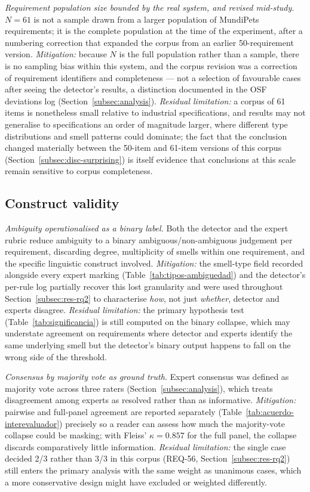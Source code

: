 \documentclass[pdflatex,sn-mathphys-num]{sn-jnl}
\theoremstyle{thmstyleone}%
\theoremstyle{thmstyletwo}%
\theoremstyle{thmstylethree}%
\begin{document}
	\emph{Requirement population size bounded by the real system, and revised
		mid-study.} $N=61$ is not a sample drawn from a larger population of MundiPets
	requirements; it is the complete population at the time of the experiment,
	after a numbering correction that expanded the corpus from an earlier
	50-requirement version. \emph{Mitigation:} because $N$ is the full population
	rather than a sample, there is no sampling bias within this system, and the
	corpus revision was a correction of requirement identifiers and completeness
	--- not a selection of favourable cases after seeing the detector's results, a
	distinction documented in the OSF deviations log
	(Section~\ref{subsec:analysis}). \emph{Residual limitation:} a corpus of 61
	items is nonetheless small relative to industrial specifications, and results
	may not generalise to specifications an order of magnitude larger, where
	different type distributions and smell patterns could dominate; the fact that
	the conclusion changed materially between the 50-item and 61-item versions of
	this corpus (Section~\ref{subsec:disc-surprising}) is itself evidence that
	conclusions at this scale remain sensitive to corpus completeness.
	
	\subsection{Construct validity}\label{subsec:threats-construct}
	
	\emph{Ambiguity operationalised as a binary label.} Both the detector and the
	expert rubric reduce ambiguity to a binary ambiguous/non-ambiguous judgement per
	requirement, discarding degree, multiplicity of smells within one requirement,
	and the specific linguistic construct involved. \emph{Mitigation:} the
	smell-type field recorded alongside every expert marking
	(Table~\ref{tab:tipos-ambiguedad}) and the detector's per-rule log partially
	recover this lost granularity and were used throughout
	Section~\ref{subsec:res-rq2} to characterise \emph{how}, not just \emph{whether},
	detector and experts disagree. \emph{Residual limitation:} the primary
	hypothesis test (Table~\ref{tab:significancia}) is still computed on the binary
	collapse, which may understate agreement on requirements where detector and
	experts identify the same underlying smell but the detector's binary output
	happens to fall on the wrong side of the threshold.
	
	\emph{Consensus by majority vote as ground truth.} Expert consensus was defined
	as majority vote across three raters (Section~\ref{subsec:analysis}), which
	treats disagreement among experts as resolved rather than as informative.
	\emph{Mitigation:} pairwise and full-panel agreement are reported separately
	(Table~\ref{tab:acuerdo-interevaluador}) precisely so a reader can assess how
	much the majority-vote collapse could be masking; with Fleiss' $\kappa=0.857$
	for the full panel, the collapse discards comparatively little information.
	\emph{Residual limitation:} the single case decided 2/3 rather than 3/3 in this
	corpus (REQ-56, Section~\ref{subsec:res-rq2}) still enters the primary analysis
	with the same weight as unanimous cases, which a more conservative design might
	have excluded or weighted differently.
	
\end{document}

